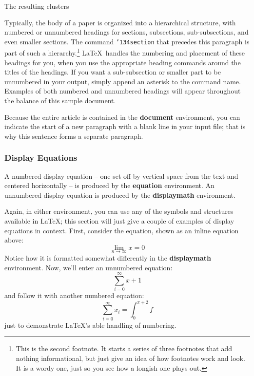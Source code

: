 \documentclass{acm_proc_article-sp}
\begin{document}
The resulting clusters 

Typically, the body of a paper is organized
into a hierarchical structure, with numbered or unnumbered
headings for sections, subsections, sub-subsections, and even
smaller sections.  The command \texttt{{\char'134}section} that
precedes this paragraph is part of such a
hierarchy.\footnote{This is the second footnote.  It
starts a series of three footnotes that add nothing
informational, but just give an idea of how footnotes work
and look. It is a wordy one, just so you see
how a longish one plays out.} \LaTeX\ handles the numbering
and placement of these headings for you, when you use
the appropriate heading commands around the titles
of the headings.  If you want a sub-subsection or
smaller part to be unnumbered in your output, simply append an
asterisk to the command name.  Examples of both
numbered and unnumbered headings will appear throughout the
balance of this sample document.

Because the entire article is contained in
the \textbf{document} environment, you can indicate the
start of a new paragraph with a blank line in your
input file; that is why this sentence forms a separate paragraph.

\subsubsection{Display Equations}
A numbered display equation -- one set off by vertical space
from the text and centered horizontally -- is produced
by the \textbf{equation} environment. An unnumbered display
equation is produced by the \textbf{displaymath} environment.

Again, in either environment, you can use any of the symbols
and structures available in \LaTeX; this section will just
give a couple of examples of display equations in context.
First, consider the equation, shown as an inline equation above:
\begin{equation}\lim_{n\rightarrow \infty}x=0\end{equation}
Notice how it is formatted somewhat differently in
the \textbf{displaymath}
environment.  Now, we'll enter an unnumbered equation:
\begin{displaymath}\sum_{i=0}^{\infty} x + 1\end{displaymath}
and follow it with another numbered equation:
\begin{equation}\sum_{i=0}^{\infty}x_i=\int_{0}^{\pi+2} f\end{equation}
just to demonstrate \LaTeX's able handling of numbering.
\end{document}
